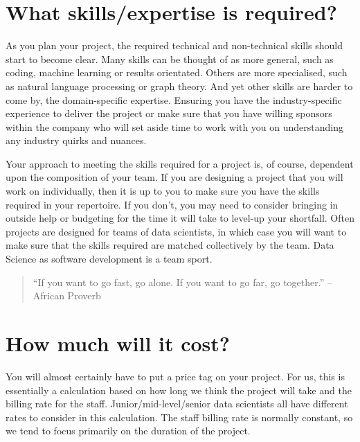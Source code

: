 \documentclass[
]{book}
\begin{document}
\hypertarget{what-skillsexpertise-is-required}{%
\section{What skills/expertise is required?}\label{what-skillsexpertise-is-required}}

As you plan your project, the required technical and non-technical skills should start to become clear. Many skills can be thought of as more general, such as coding, machine learning or results orientated. Others are more specialised, such as natural language processing or graph theory. And yet other skills are harder to come by, the domain-specific expertise. Ensuring you have the industry-specific experience to deliver the project or make sure that you have willing sponsors within the company who will set aside time to work with you on understanding any industry quirks and nuances.

Your approach to meeting the skills required for a project is, of course, dependent upon the composition of your team. If you are designing a project that you will work on individually, then it is up to you to make sure you have the skills required in your repertoire. If you don't, you may need to consider bringing in outside help or budgeting for the time it will take to level-up your shortfall. Often projects are designed for teams of data scientists, in which case you will want to make sure that the skills required are matched collectively by the team. Data Science as software development is a team sport.

\begin{quote}
``If you want to go fast, go alone. If you want to go far, go together.'' -- African Proverb
\end{quote}

\hypertarget{how-much-will-it-cost}{%
\section{How much will it cost?}\label{how-much-will-it-cost}}

You will almost certainly have to put a price tag on your project. For us, this is essentially a calculation based on how long we think the project will take and the billing rate for the staff. Junior/mid-level/senior data scientists all have different rates to consider in this calculation. The staff billing rate is normally constant, so we tend to focus primarily on the duration of the project.
\end{document}
